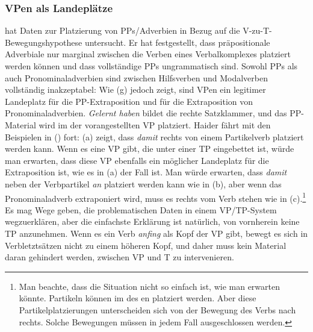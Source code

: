 \subsubsection{VPen als Landeplätze}
\label{sec-cp-tp-vp-extraposition}


\citet[--64]{Haider2010a} hat Daten zur Platzierung von PPs/Adverbien in Bezug auf die V-zu-T-Bewegungshypothese
untersucht. Er hat festgestellt, dass präpositionale Adverbiale nur marginal zwischen die Verben eines Verbalkomplexes
platziert werden können und dass vollständige PPs ungrammatisch sind. Sowohl PPs als auch Pronominaladverbien sind zwischen
Hilfsverben und Modalverben vollständig inakzeptabel:
\eal
{}
\zl 
Wie (g) jedoch zeigt, sind VPen ein legitimer Landeplatz für die PP-Extraposition und für die
  Extraposition von Pronominaladverbien. \emph{Gelernt haben} bildet die rechte Satzklammer,
  und das PP-Material wird im \nf der vorangestellten VP platziert.
Haider fährt mit den Beispielen in () fort:
\eal
{}
\zl
(a) zeigt, dass \emph{damit} rechts von einem Partikelverb platziert werden kann. Wenn es eine VP gibt,
die unter einer TP eingebettet ist, würde man erwarten, dass diese VP ebenfalls ein möglicher Landeplatz
für die Extraposition ist, wie es in (a) der Fall ist. Man würde erwarten, dass \emph{damit} neben
der Verbpartikel \emph{an} platziert werden kann wie in (b), aber wenn das Pronominaladverb extraponiert wird,
muss es rechts vom Verb stehen wie in (c).\footnote{
Man beachte, dass die Situation nicht so einfach ist, wie man erwarten könnte. Partikeln können im
\mf des en platziert werden. Aber diese Partikelplatzierungen unterscheiden sich von der Bewegung des Verbs nach
rechts. Solche Bewegungen müssen in jedem Fall ausgeschlossen werden.%
} Es mag Wege geben, die problematischen Daten in einem
VP/TP-System wegzuerklären, aber die einfachste Erklärung ist natürlich, von vornherein keine TP
anzunehmen. Wenn es ein Verb \emph{anfing} als Kopf der VP gibt, bewegt es sich in
Verbletztsätzen nicht zu einem höheren Kopf, und daher muss kein Material daran gehindert werden, zwischen VP und T zu intervenieren.


